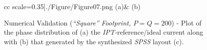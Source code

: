\begin{figure}[H]
\begin{center}
\begin{tabular}{cc}
  scale=0.35]{./Figure/Figure07.png}\tabularnewline
(a)&
(b)\tabularnewline
{}\tabularnewline
{}\tabularnewline
\end{tabular}\end{center}


\caption{\footnotesize\label{cap:Square_Phase} Numerical Validation (\emph{{}``Square''}
\emph{Footprint, $P=Q=200$}) - Plot of the phase distribution of
(a) the \emph{IPT-}reference/ideal current along with (b) that generated
by the synthesized \emph{SPSS} layout (c).}
\end{figure}


